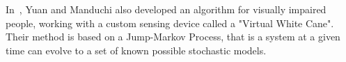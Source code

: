 In~\cite{yuan05dynamic}, Yuan and Manduchi also developed an algorithm for
visually impaired people, working with a custom sensing device called
a "Virtual White Cane". Their method is based on a Jump-Markov Process, that is
a system at a given time can evolve to a set of known possible stochastic
models.
